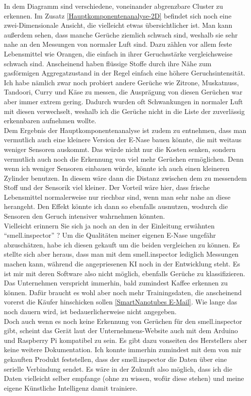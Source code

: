 \documentclass[10pt]{article}
\begin{document}
In dem Diagramm sind verschiedene, voneinander abgrenzbare Cluster zu erkennen. Im Zusatz \ref{Hauptkomponentenanalyse-2D} befindet sich noch eine zwei-Dimensionale
Ansicht, die vielleicht etwas übersichtlicher ist. Man kann außerdem sehen, dass manche Gerüche ziemlich schwach sind, weshalb 
sie sehr nahe an den Messungen von normaler Luft sind. Dazu zählen vor allem feste Lebensmittel wie Orangen, die einfach in ihrer Geruchsstärke vergleichsweise schwach sind.
Anscheinend haben flüssige Stoffe durch ihre Nähe zum gasförmigen Aggregatzustand in der Regel einfach eine höhere Geruchsintensität. Ich habe nämlich
zwar noch probiert andere Gerüche wie Zitrone, Muskatnuss, Tandoori, Curry und Käse zu messen, die Ausprägung von diesen Gerüchen war aber immer extrem gering.
Dadurch wurden oft Schwankungen in normaler Luft mit diesen verwechselt, weshalb ich die Gerüche nicht in die Liste der zuverlässig erkennbaren aufnehmen wollte.\\
Dem Ergebnis der Hauptkomponentenanalyse ist zudem zu entnehmen, dass man vermutlich auch eine kleinere
Version der E-Nase bauen könnte, die mit weitaus weniger Sensoren auskommt. Das würde nicht nur die Kosten senken, sondern vermutlich auch noch die Erkennung von 
viel mehr Gerüchen ermöglichen. Denn wenn ich weniger Sensoren einbauen würde, könnte ich auch einen kleineren Zylinder benutzen. In diesem wäre dann die Distanz zwischen dem zu messendem Stoff
und der Sensorik viel kleiner. Der Vorteil wäre hier, dass frische Lebensmittel normalerweise nur riechbar sind, wenn man sehr nahe an diese herangeht. Den Effekt könnte ich dann so ebenfalls
ausnutzen, wodurch die Sensoren den Geruch intensiver wahrnehmen könnten.\\
Vielleicht erinnern Sie sich ja noch an den in der Einleitung erwähnten "`smell.inspector"' ? Um die Qualitäten meiner eigenen E-Nase ungefähr abzuschätzen, habe ich diesen gekauft
um die beiden vergleichen zu können. Es stellte sich aber heraus, dass man mit dem smell.inspector lediglich Messungen machen kann, während die angepriesenen KI noch in der 
Entwicklung steht. Es ist mir mit deren Software also nicht möglich, ebenfalls Gerüche zu klassifizieren. Das Unternehmen verspricht immerhin, bald zumindest Kaffee erkennen zu können. 
Dafür braucht es wohl aber noch mehr Trainingsdaten, die anscheinend vorerst die Käufer hinschicken sollen \ref{SmartNanotubes E-Mail}. Wie lange das noch dauern wird,
ist bedauerlicherweise nicht angegeben.\\
Doch auch wenn es noch keine Erkennung von Gerüchen für den smell.inspector gibt, scheint das Gerät laut der Unternehmens-Website auch mit dem Arduino und Raspberry Pi kompatibel zu sein.
Es gibt dazu vonseiten des Herstellers aber keine weitere Dokumentation. Ich konnte immerhin zumindest mit dem von mir gekauften 
Produkt feststellen, dass der smell.inspector die Daten über eine serielle Verbindung sendet. Es wäre in der Zukunft also möglich, dass ich die Daten vielleicht selber empfange
(ohne zu wissen, wofür diese stehen) und meine eigene Künstliche Intelligenz damit trainiere.
\end{document}
